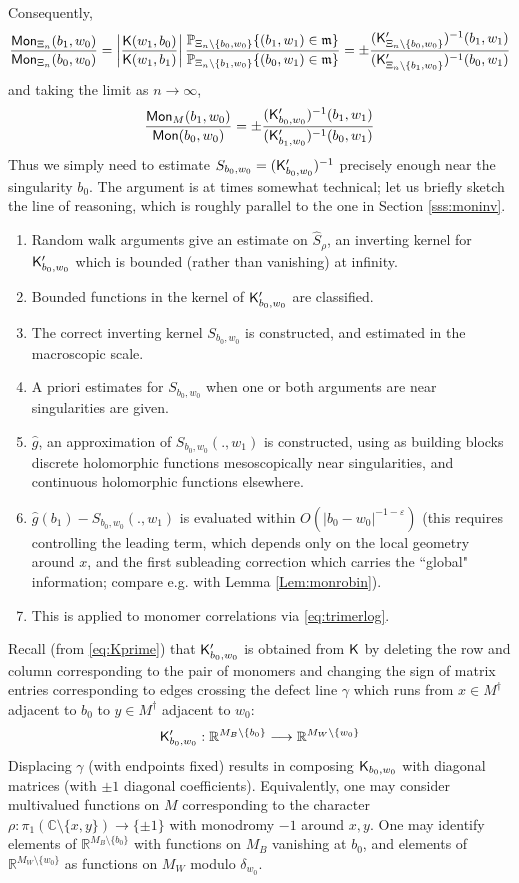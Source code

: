 \documentclass[10pt]{article}
\newcommand{\R}{\mathbb{R}}
\newcommand{\C}{\mathbb{C}}
\newcommand{\eps}{\varepsilon}
\renewcommand{\P}{\mathbb{P}}
\newcommand{\rK}{{\sf K}}
\newcommand{\dg}{\dagger}
\newcommand{\mfm}{{\mathfrak m}}
\newcommand{\Mon}{{\sf Mon}}
\begin{document}
Consequently,
$$\frac{\Mon_{\Xi_n}(b_1,w_0)}{\Mon_{\Xi_n}(b_0,w_0)}=\left|\frac{\rK(w_1,b_0)}{\rK(w_1,b_1)}\right|\frac{\P_{\Xi_n\setminus\{b_0,w_0\}}\{(b_1,w_1)\in\mfm\}}{\P_{\Xi_n\setminus\{b_1,w_0\}}\{(b_0,w_1)\in\mfm\}}=\pm\frac{(\rK'_{\Xi_n\setminus\{b_0,w_0\}})^{-1}(b_1,w_1)}
{(\rK'_{\Xi_n\setminus\{b_1,w_0\}})^{-1}(b_0,w_1)}
$$
and taking the limit as $n\rightarrow\infty$,
\begin{equation}\label{eq:trimerlog}
\frac{\Mon_M(b_1,w_0)}{\Mon(b_0,w_0)}=\pm\frac{(\rK'_{b_0,w_0})^{-1}(b_1,w_1)}
{(\rK'_{b_1,w_0})^{-1}(b_0,w_1)}
\end{equation}
Thus we simply need to estimate $S_{b_0,w_0}=(\rK'_{b_0,w_0})^{-1}$ precisely enough near the singularity $b_0$. The argument is at times somewhat technical; let us briefly sketch the line of reasoning, which is roughly parallel to the one in Section \ref{sss:moninv}.
\begin{enumerate}
\item Random walk arguments give an estimate on $\hat S_\rho$, an inverting kernel for $\rK'_{b_0,w_0}$ which is bounded (rather than vanishing) at infinity. 
\item Bounded functions in the kernel of $\rK'_{b_0,w_0}$ are classified.
\item The correct inverting kernel $S_{b_0,w_0}$ is constructed, and estimated in the macroscopic scale.
\item A priori estimates for $S_{b_0,w_0}$ when one or both arguments are near singularities are given.
\item $\hat g$, an approximation of $S_{b_0,w_0}(.,w_1)$ is constructed, using as building blocks discrete holomorphic functions mesoscopically near singularities, and continuous holomorphic functions elsewhere.
\item $\hat g(b_1)-S_{b_0,w_0}(.,w_1)$ is evaluated within $O(|b_0-w_0|^{-1-\eps})$ (this requires controlling the leading term, which depends only on the local geometry around $x$, and the first subleading correction which carries the ``global" information; compare e.g. with Lemma \ref{Lem:monrobin}).
\item This is applied to monomer correlations via \eqref{eq:trimerlog}.
\end{enumerate}


Recall (from \eqref{eq:Kprime}) that $\rK'_{b_0,w_0}$ is obtained from $\rK$ by deleting the row and column corresponding to the pair of monomers and changing the sign of matrix entries corresponding to edges crossing the defect line $\gamma$ which runs  from $x\in M^\dg$ adjacent to $b_0$ to $y\in M^\dg$ adjacent to $w_0$:
%
%
$$\rK'_{b_0,w_0}:\R^{M_B\setminus\{b_0\}}\longrightarrow \R^{M_W\setminus\{w_0\}}$$
Displacing $\gamma$ (with endpoints fixed) results in composing $\rK_{b_0,w_0}$ with diagonal matrices (with $\pm 1$ diagonal coefficients). Equivalently, one may consider multivalued functions on $M$ corresponding to the character $\rho:\pi_1(\C\setminus\{x,y\})\rightarrow\{\pm 1\}$ with monodromy $-1$ around $x,y$. One may identify elements of $\R^{M_B\setminus\{b_0\}}$ with functions on $M_B$ vanishing at $b_0$, and elements of $\R^{M_W\setminus\{w_0\}}$ as functions on $M_W$ modulo $\delta_{w_0}$.\\
\end{document}
